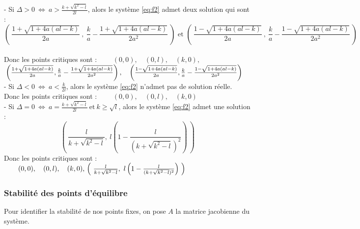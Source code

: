 \documentclass{article}
\begin{document}
\newpage
- Si $\Delta > 0\ \Leftrightarrow\ a > \frac{k + \sqrt{k^2 - l} }{2l}$, alors le système \eqref{eq:f2} admet deux solution qui sont : 
\begin{equation*}
    \left(\ \dfrac{1 + \sqrt{1 + 4a(al -k)}}{2a}\ ,\ \dfrac{k}{a} - \dfrac{1 + \sqrt{1 + 4a(al -k)}}{2a^2}\ \right)
    \text{ et }
    \left(\ \dfrac{1 - \sqrt{1 + 4a(al -k)}}{2a}\ ,\ \dfrac{k}{a} - \dfrac{1 - \sqrt{1 + 4a(al -k)}}{2a^2}\ \right)
\end{equation*}\\

\qquad Donc les points critiques sont :
$\qquad (0,0),\quad (0,l),\quad (k,0),$\\

$\phantom{} \hfill \left(\frac{1 + \sqrt{1 + 4a(al -k)}}{2a}, \frac{k}{a} - \frac{1 + \sqrt{1 + 4a(al -k)}}{2a^2} \right),
\quad \left(\frac{1 - \sqrt{1 + 4a(al -k)}}{2a}, \frac{k}{a} - \frac{1 - \sqrt{1 + 4a(al -k)}}{2a^2}\right) \hfill$\\

\vspace{1cm}
- Si $\Delta < 0\ \Leftrightarrow\ a < \frac{k}{2l}$, alors le système \eqref{eq:f2} n'admet pas de solution réelle.\\

Donc les points critiques sont : $\qquad (0,0),\quad (0,l),\quad (k,0)$ \\

\vspace{1cm}
- Si $\Delta = 0\ \Leftrightarrow\ a = \frac{k + \sqrt{k^2 - l} }{2l}\ \text{et}\ k \geqslant \sqrt{l}$, alors le système \eqref{eq:f2} admet une solution : 
\begin{equation*}
    \left(\ \dfrac{l}{k + \sqrt{k^2 - l}},\ l\left(1 - \dfrac{l}{(k + \sqrt{k^2 - l})^2} \right)\ \right)
\end{equation*}
\qquad Donc les points critiques sont : $\qquad (0,0),\quad (0,l),\quad (k,0), \\\\
\phantom{} \hfill \left(\ \frac{l}{k + \sqrt{k^2 - l}},\ l\left(1 - \frac{l}{(k + \sqrt{k^2 - l})^2} \right)\ \right) \hfill$

\newpage
\subsubsection{Stabilité des points d'équilibre}
\noindent
Pour identifier la stabilité de nos points fixes,  on pose $A$ la matrice jacobienne du système.\\
\end{document}

